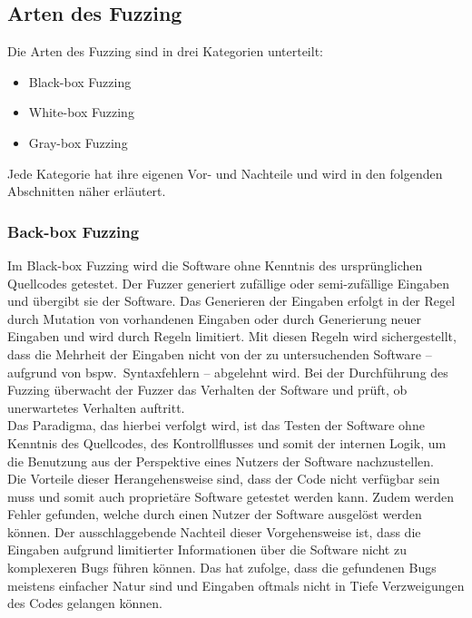 
\subsection{Arten des Fuzzing}\label{subsec:arten-des-fuzzing}
Die Arten des Fuzzing sind in drei Kategorien unterteilt:
\begin{itemize}
    \item Black-box Fuzzing
    \item White-box Fuzzing
    \item Gray-box Fuzzing
\end{itemize}
Jede Kategorie hat ihre eigenen Vor- und Nachteile und wird in den folgenden Abschnitten näher erläutert.
\subsubsection{Back-box Fuzzing}
Im Black-box Fuzzing wird die Software ohne Kenntnis des ursprünglichen Quellcodes getestet.
Der Fuzzer generiert zufällige oder semi-zufällige Eingaben und übergibt sie der Software.
Das Generieren der Eingaben erfolgt in der Regel durch Mutation von vorhandenen Eingaben oder durch Generierung neuer Eingaben
und wird durch Regeln limitiert.
Mit diesen Regeln wird sichergestellt, dass die Mehrheit der Eingaben nicht von der zu untersuchenden Software -- aufgrund
von bspw.\ Syntaxfehlern -- abgelehnt wird.
Bei der Durchführung des Fuzzing überwacht der Fuzzer das Verhalten der Software und prüft, ob unerwartetes Verhalten auftritt. \\
Das Paradigma, das hierbei verfolgt wird, ist das Testen der Software ohne Kenntnis des Quellcodes, des Kontrollflusses und somit der internen
Logik, um die Benutzung aus der Perspektive eines Nutzers der Software nachzustellen.\\
Die Vorteile dieser Herangehensweise sind, dass der Code nicht verfügbar sein muss und somit auch proprietäre Software getestet werden kann.
Zudem werden Fehler gefunden, welche durch einen Nutzer der Software ausgelöst werden können.
Der ausschlaggebende Nachteil dieser Vorgehensweise ist, dass die Eingaben aufgrund limitierter Informationen über die Software
nicht zu komplexeren Bugs führen können.
Das hat zufolge, dass die gefundenen Bugs meistens einfacher Natur sind und Eingaben oftmals nicht in Tiefe Verzweigungen des Codes
gelangen können.
